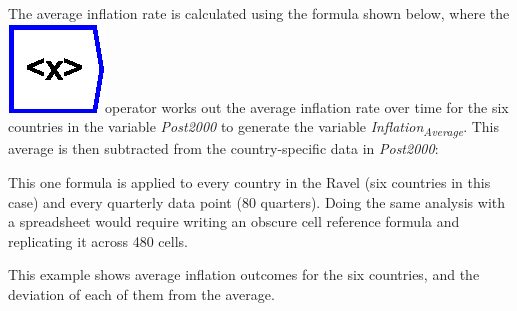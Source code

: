 The average inflation rate is calculated using the formula shown below,
where the \includegraphics{images/mean}operator works out the average
inflation rate over time for the six countries in the variable \emph{Post2000}
to generate the variable \emph{Inflation}\textsubscript{\emph{Average}}.
This average is then subtracted from the country-specific data in
\emph{Post2000}:


This one formula is applied to every country in the Ravel (six countries
in this case) and every quarterly data point (80 quarters). Doing
the same analysis with a spreadsheet would require writing an obscure
cell reference formula and replicating it across 480 cells.

This example shows average inflation outcomes for the six countries,
and the deviation of each of them from the average.
\begin{center}
\par\end{center}

